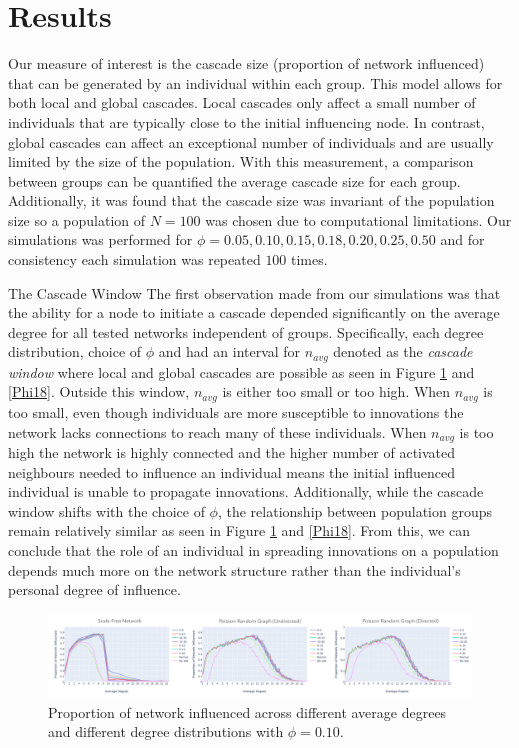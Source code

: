 \documentclass[10pt, oneside, reqno]{amsart}
\makeatletter
\theoremstyle{plain}%
\theoremstyle{definition}
\theoremstyle{remark}
\renewcommand\subsection{\@startsection{subsection}{2}%
  \z@{.5\linespacing\@plus.7\linespacing}{-.5em}%
  {\normalfont\scshape}}
\makeatother
\begin{document}
\section{Results}

Our measure of interest is the cascade size (proportion of network influenced) that can be generated by an individual within each group.
This model allows for both local and global cascades. 
Local cascades only affect a small number of individuals that are typically close to the initial influencing node. 
In contrast, global cascades can affect an exceptional number of individuals and are usually limited by the size of the population.
With this measurement, a comparison between groups can be quantified the average cascade size for each group.
Additionally, it was found that the cascade size was invariant of the population size so a population of $N=100$ was chosen due to computational limitations. Our simulations was performed for $\phi= 0.05,0.10,0.15,0.18,0.20,0.25,0.50$ and for consistency each simulation was repeated $100$ times.
 
\subsection{The Cascade Window}
The first observation made from our simulations was that the ability for a node to initiate a cascade depended significantly on the average degree for all tested networks independent of groups.
Specifically, each degree distribution, choice of $\phi$ and had an interval for $n_{avg}$ denoted as the \textit{cascade window} where local and global cascades are possible as seen in Figure \ref{Phi10} and \ref{Phi18}.
Outside this window, $n_{avg}$ is either too small or too high.
When $n_{avg}$ is too small, even though individuals are more susceptible to innovations the network lacks connections to reach many of these individuals.
When $n_{avg}$ is too high the network is highly connected and the higher number of activated neighbours needed to influence an individual means the initial influenced individual is unable to propagate innovations.
Additionally, while the cascade window shifts with the choice of $\phi$, the relationship between population groups remain relatively similar as seen in Figure \ref{Phi10} and \ref{Phi18}.
From this, we can conclude that the role of an individual in spreading innovations on a population depends much more on the network structure rather than the individual's personal degree of influence.

\begin{figure}[ht]
    \includegraphics[scale=0.2]{Report/figs/SFRGRG10.png}
    \caption{Proportion of network influenced across different average degrees and different degree distributions with $\phi = 0.10$.}
    \label{Phi10}
\end{figure}
\end{document}
